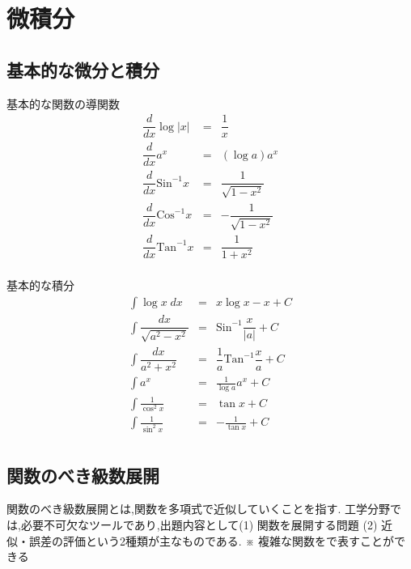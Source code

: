 \documentclass[a4paper]{jsarticle}
\begin{document}
\section{微積分}
\subsection{基本的な微分と積分}
\begin{itembox}[l]{基本的な関数の導関数}
    \begin{eqnarray*}
        \dfrac{d}{dx}\log |x|&=&\dfrac{1}{x}\\
        \dfrac{d}{dx}a^x&=&\left(\log a\right)a^x\\
        \dfrac{d}{dx}\mathrm{Sin}^{-1}x&=&\dfrac{1}{\sqrt{1-x^2}}\\
        \dfrac{d}{dx}\mathrm{Cos}^{-1}x&=&-\dfrac{1}{\sqrt{1-x^2}}\\
        \dfrac{d}{dx}\mathrm{Tan}^{-1}x&=&\dfrac{1}{1+x^2}\\
    \end{eqnarray*}
\end{itembox}
\begin{itembox}[l]{基本的な積分}
    \begin{eqnarray*}
        \displaystyle
        \int \log x\; dx&=&x\log x-x +C\\
        \int \dfrac{dx}{\sqrt{a^2-x^2}}&=&\mathrm{Sin}^{-1}\dfrac{x}{|a|} +C\\
        \int \dfrac{dx}{a^2+x^2}&=&\dfrac{1}{a}\mathrm{Tan}^{-1}\dfrac{x}{a} +C\\
        \int a^x&=&\frac{1}{\log a}a^x +C\\
        \int \frac{1}{\cos ^2x}&=& \tan x+C\\
        \int \frac{1}{\sin^2 x}&=& -\frac{1}{\tan x}+C\\
    \end{eqnarray*}
\end{itembox}
\subsection{関数のべき級数展開}
関数のべき級数展開とは,関数を多項式で近似していくことを指す.
工学分野では,必要不可欠なツールであり,出題内容として(1) 関数を展開する問題
(2) 近似・誤差の評価という2種類が主なものである.
※ 複雑な関数をで表すことができる
\end{document}
